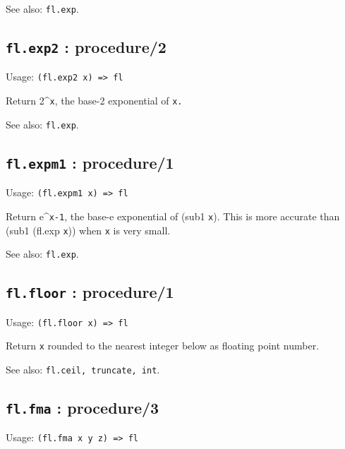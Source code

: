 \documentclass[
]{article}
\newcommand{\passthrough}[1]{#1}
\begin{document}
See also: \passthrough{\lstinline!fl.exp!}.

\hypertarget{fl.exp2-procedure2-1}{%
\subsection{\texorpdfstring{\texttt{fl.exp2} :
procedure/2}{fl.exp2 : procedure/2}}\label{fl.exp2-procedure2-1}}

Usage: \passthrough{\lstinline!(fl.exp2 x) => fl!}

Return 2\^{}\passthrough{\lstinline!x!}, the base-2 exponential of
\passthrough{\lstinline!x.!}

See also: \passthrough{\lstinline!fl.exp!}.

\hypertarget{fl.expm1-procedure1-1}{%
\subsection{\texorpdfstring{\texttt{fl.expm1} :
procedure/1}{fl.expm1 : procedure/1}}\label{fl.expm1-procedure1-1}}

Usage: \passthrough{\lstinline!(fl.expm1 x) => fl!}

Return e\^{}\passthrough{\lstinline!x-1!}, the base-e exponential of
(sub1 \passthrough{\lstinline!x!}). This is more accurate than (sub1
(fl.exp \passthrough{\lstinline!x!})) when \passthrough{\lstinline!x!}
is very small.

See also: \passthrough{\lstinline!fl.exp!}.

\hypertarget{fl.floor-procedure1-1}{%
\subsection{\texorpdfstring{\texttt{fl.floor} :
procedure/1}{fl.floor : procedure/1}}\label{fl.floor-procedure1-1}}

Usage: \passthrough{\lstinline!(fl.floor x) => fl!}

Return \passthrough{\lstinline!x!} rounded to the nearest integer below
as floating point number.

See also: \passthrough{\lstinline!fl.ceil, truncate, int!}.

\hypertarget{fl.fma-procedure3-1}{%
\subsection{\texorpdfstring{\texttt{fl.fma} :
procedure/3}{fl.fma : procedure/3}}\label{fl.fma-procedure3-1}}

Usage: \passthrough{\lstinline!(fl.fma x y z) => fl!}
\end{document}
